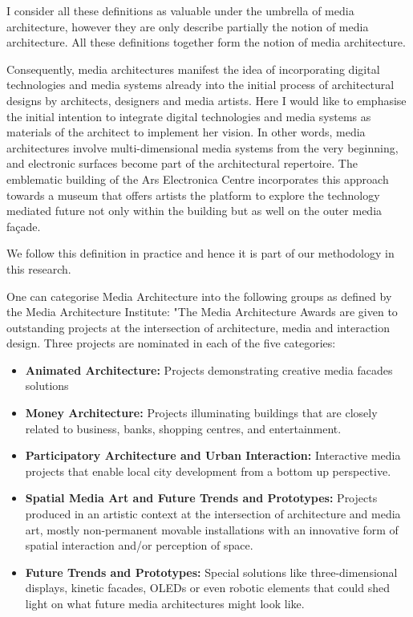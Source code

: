 I consider all these definitions as valuable under the umbrella of media architecture, however they are only describe partially the notion of media architecture. All these definitions together form the notion of media architecture. 

Consequently, media architectures manifest the idea of incorporating digital technologies and media systems already into the initial process of architectural designs by architects, designers and media artists. Here I would like to emphasise the initial intention to integrate digital technologies and media systems as materials of the architect to implement her vision. In other words, media architectures involve multi-dimensional media systems from the very beginning, and electronic surfaces become part of the architectural repertoire. The emblematic building of the Ars Electronica Centre incorporates this approach towards a museum that offers artists the platform to explore the technology mediated future not only within the building but as well on the outer media façade. 

We follow this definition in practice and hence it is part of our methodology in this research.


One can categorise Media Architecture into the following groups as defined by the Media Architecture Institute:
"The Media Architecture Awards are given to outstanding projects at the intersection of architecture, media and interaction design. Three projects are nominated in each of the five categories:


\begin{itemize}
\item \textbf{Animated Architecture:} Projects demonstrating creative media facades solutions
\item \textbf{Money Architecture:} Projects illuminating buildings that are closely related to business, banks, shopping centres, and entertainment.
\item \textbf{Participatory Architecture and Urban Interaction:} Interactive media projects that enable local city development from a bottom up perspective.
\item \textbf{Spatial Media Art and Future Trends and Prototypes:} Projects produced in an artistic context at the intersection of architecture and media art, mostly non-permanent movable installations with an innovative form of spatial interaction and/or perception of space.
\item \textbf{Future Trends and Prototypes:} Special solutions like three-dimensional displays, kinetic facades, OLEDs or even robotic elements that could shed light on what future media architectures might look like.
\end{itemize}

